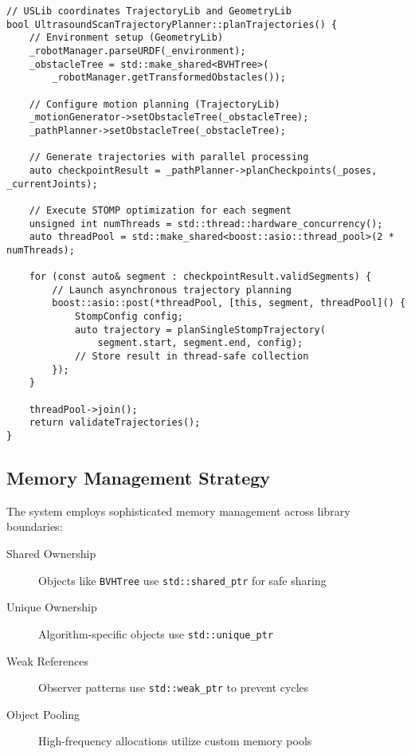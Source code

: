 \begin{lstlisting}[caption={Cross-Library Integration Example}, label={lst:cross_library}]
// USLib coordinates TrajectoryLib and GeometryLib
bool UltrasoundScanTrajectoryPlanner::planTrajectories() {
    // Environment setup (GeometryLib)
    _robotManager.parseURDF(_environment);
    _obstacleTree = std::make_shared<BVHTree>(
        _robotManager.getTransformedObstacles());
    
    // Configure motion planning (TrajectoryLib)
    _motionGenerator->setObstacleTree(_obstacleTree);
    _pathPlanner->setObstacleTree(_obstacleTree);
    
    // Generate trajectories with parallel processing
    auto checkpointResult = _pathPlanner->planCheckpoints(_poses, _currentJoints);
    
    // Execute STOMP optimization for each segment
    unsigned int numThreads = std::thread::hardware_concurrency();
    auto threadPool = std::make_shared<boost::asio::thread_pool>(2 * numThreads);
    
    for (const auto& segment : checkpointResult.validSegments) {
        // Launch asynchronous trajectory planning
        boost::asio::post(*threadPool, [this, segment, threadPool]() {
            StompConfig config;
            auto trajectory = planSingleStompTrajectory(
                segment.start, segment.end, config);
            // Store result in thread-safe collection
        });
    }
    
    threadPool->join();
    return validateTrajectories();
}
\end{lstlisting}

\subsection{Memory Management Strategy}

The system employs sophisticated memory management across library boundaries:

\begin{description}
    \item[Shared Ownership] Objects like \texttt{BVHTree} use \texttt{std::shared\_ptr} for safe sharing
    \item[Unique Ownership] Algorithm-specific objects use \texttt{std::unique\_ptr}
    \item[Weak References] Observer patterns use \texttt{std::weak\_ptr} to prevent cycles
    \item[Object Pooling] High-frequency allocations utilize custom memory pools
\end{description}

